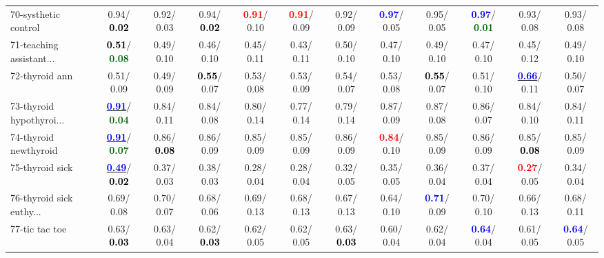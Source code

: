 \begin{table}[h]
\begin{center}
{\begin{tabular}{lc|c|c|c|c|c|c|c|c|c|c}
70-systhetic control &   0.94/\textcolor{black}{\textbf{  0.02}} &   0.92/  0.03 &   0.94/\textcolor{black}{\textbf{  0.02}} & \textcolor{red}{\textbf{  0.91}}/  0.10 & \textcolor{red}{\textbf{  0.91}}/  0.09 &   0.92/  0.09 & \textcolor{blue}{\textbf{  0.97}}/  0.05 &   0.95/  0.05 & \textcolor{blue}{\textbf{  0.97}}/\textcolor{darkgreen}{\textbf{  0.01}} &   0.93/  0.08 &   0.93/  0.08 \\
71-teaching assistant... & \textcolor{black}{\textbf{  0.51}}/\textcolor{darkgreen}{\textbf{  0.08}} &   0.49/  0.10 &   0.46/  0.10 &   0.45/  0.11 &   0.43/  0.11 &   0.50/  0.10 &   0.47/  0.10 &   0.49/  0.10 &   0.47/  0.10 &   0.45/  0.12 &   0.49/  0.10 \\ \hline
72-thyroid ann &   0.51/  0.09 &   0.49/  0.09 & \textcolor{black}{\textbf{  0.55}}/  0.07 &   0.53/  0.08 &   0.53/  0.09 &   0.54/  0.07 &   0.53/  0.08 & \textcolor{black}{\textbf{  0.55}}/  0.07 &   0.51/  0.10 & \underline{\textcolor{blue}{\textbf{  0.66}}}/  0.11 &   0.50/  0.07 \\
73-thyroid hypothyroi... & \underline{\textcolor{blue}{\textbf{  0.91}}}/\textcolor{darkgreen}{\textbf{  0.04}} &   0.84/  0.11 &   0.84/  0.08 &   0.80/  0.14 &   0.77/  0.14 &   0.79/  0.14 &   0.87/  0.09 &   0.87/  0.08 &   0.86/  0.07 &   0.84/  0.10 &   0.84/  0.11 \\
74-thyroid newthyroid & \underline{\textcolor{blue}{\textbf{  0.91}}}/\textcolor{darkgreen}{\textbf{  0.07}} &   0.86/\textcolor{black}{\textbf{  0.08}} &   0.86/  0.09 &   0.85/  0.09 &   0.85/  0.09 &   0.86/  0.09 & \textcolor{red}{\textbf{  0.84}}/  0.10 &   0.85/  0.09 &   0.86/  0.09 &   0.85/\textcolor{black}{\textbf{  0.08}} &   0.85/  0.09 \\
75-thyroid sick & \underline{\textcolor{blue}{\textbf{  0.49}}}/\textcolor{black}{\textbf{  0.02}} &   0.37/  0.03 &   0.38/  0.03 &   0.28/  0.04 &   0.28/  0.04 &   0.32/  0.05 &   0.35/  0.05 &   0.36/  0.04 &   0.37/  0.04 & \textcolor{red}{\textbf{  0.27}}/  0.05 &   0.34/  0.04 \\
76-thyroid sick euthy... &   0.69/  0.08 &   0.70/  0.07 &   0.68/  0.06 &   0.69/  0.13 &   0.68/  0.13 &   0.67/  0.13 &   0.64/  0.10 & \textcolor{blue}{\textbf{  0.71}}/  0.09 &   0.70/  0.10 &   0.66/  0.13 &   0.68/  0.11 \\
77-tic tac toe &   0.63/\textcolor{black}{\textbf{  0.03}} &   0.63/  0.04 &   0.62/\textcolor{black}{\textbf{  0.03}} &   0.62/  0.05 &   0.62/  0.05 &   0.63/\textcolor{black}{\textbf{  0.03}} &   0.60/  0.04 &   0.62/  0.04 & \textcolor{blue}{\textbf{  0.64}}/  0.04 &   0.61/  0.05 & \textcolor{blue}{\textbf{  0.64}}/  0.05 \\

\end{tabular}}
\end{center}
\end{table}
